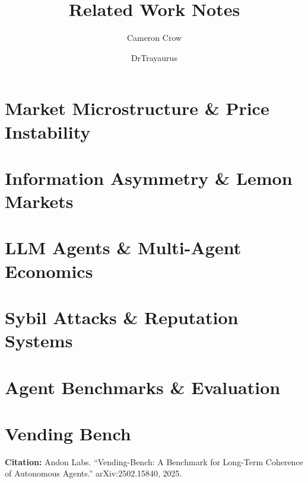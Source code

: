 \documentclass{article}
\title{Related Work Notes}
\author{Cameron Crow \and DrTrayaurus}
\date{}
\begin{document}
\maketitle

\section{Market Microstructure \& Price Instability}


\section{Information Asymmetry \& Lemon Markets}


\section{LLM Agents \& Multi-Agent Economics}


\section{Sybil Attacks \& Reputation Systems}


\section{Agent Benchmarks \& Evaluation}


\section{Vending Bench}

\textbf{Citation:} Andon Labs. ``Vending-Bench: A Benchmark for Long-Term Coherence of Autonomous Agents.'' arXiv:2502.15840, 2025.
\end{document}
